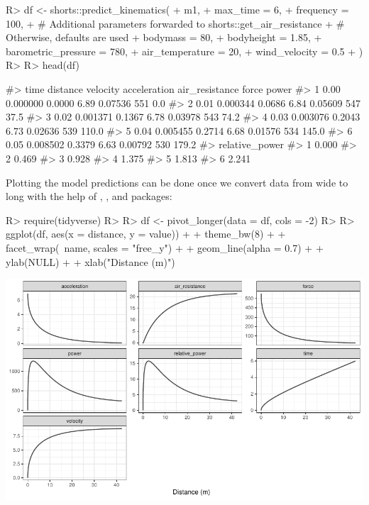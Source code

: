 \documentclass[
]{jss}
\begin{document}
\begin{CodeChunk}
\begin{CodeInput}
R> df <- shorts::predict_kinematics(
+   m1,
+   max_time = 6,
+   frequency = 100,
+   # Additional parameters forwarded to shorts::get_air_resistance
+   # Otherwise, defaults are used
+   bodymass = 80,
+   bodyheight = 1.85,
+   barometric_pressure = 780,
+   air_temperature = 20,
+   wind_velocity = 0.5
+ )
R> 
R> head(df)
\end{CodeInput}
\begin{CodeOutput}
#>   time distance velocity acceleration air_resistance force power
#> 1 0.00 0.000000   0.0000         6.89        0.07536   551   0.0
#> 2 0.01 0.000344   0.0686         6.84        0.05609   547  37.5
#> 3 0.02 0.001371   0.1367         6.78        0.03978   543  74.2
#> 4 0.03 0.003076   0.2043         6.73        0.02636   539 110.0
#> 5 0.04 0.005455   0.2714         6.68        0.01576   534 145.0
#> 6 0.05 0.008502   0.3379         6.63        0.00792   530 179.2
#>   relative_power
#> 1          0.000
#> 2          0.469
#> 3          0.928
#> 4          1.375
#> 5          1.813
#> 6          2.241
\end{CodeOutput}
\end{CodeChunk}

Plotting the model predictions can be done once we convert data from wide to long with the help of  \citep{R-dplyr},  \citep{R-tidyr}, and  \citep{R-tidyverse} packages:

\begin{CodeChunk}
\begin{CodeInput}
R> require(tidyverse)
R> 
R> df <- pivot_longer(data = df, cols = -2)
R> 
R> ggplot(df, aes(x = distance, y = value)) +
+   theme_bw(8) +
+   facet_wrap(~name, scales = "free_y") +
+   geom_line(alpha = 0.7) +
+   ylab(NULL) +
+   xlab("Distance (m)")
\end{CodeInput}


\begin{center}\includegraphics[width=1\linewidth]{paper_files/figure-latex/unnamed-chunk-8-1} \end{center}

\end{CodeChunk}
\end{document}
